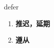 
\begin{frame}
{\huge defer}
\begin{center}
\begin{enumerate}\Large
  \item \textbf{推迟，延期}
  \item \textbf{遵从}
\end{enumerate}
\end{center}
\end{frame}
